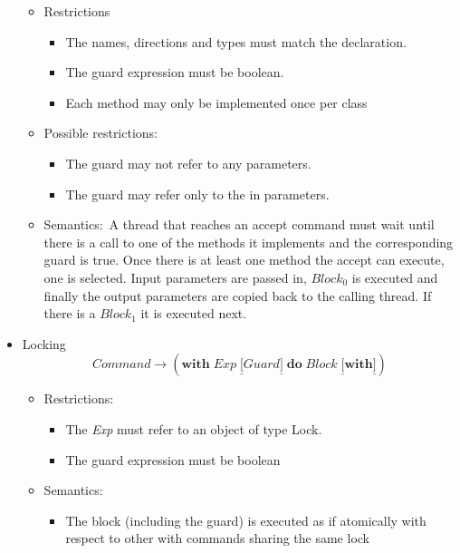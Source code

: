 \documentclass{article}%
\begin{document}
\begin{itemize}
\begin{itemize}
\item Restrictions

\begin{itemize}
\item The names, directions and types must match the declaration.

\item The guard expression must be boolean.

\item Each method may only be implemented once per class
\end{itemize}

\item Possible restrictions:

\begin{itemize}
\item The guard may not refer to any parameters.

\item The guard may refer only to the in parameters.
\end{itemize}

\item Semantics:\ A thread that reaches an accept command must wait until
there is a call to one of the methods it implements and the corresponding
guard is true. Once there is at least one method the accept can execute, one
is selected. Input parameters are passed in, $Block_{0}$ is executed and
finally the output parameters are copied back to the calling thread. If there
is a $Block_{1}$ it is executed next.
\end{itemize}

\item Locking%
\[
Command\rightarrow\left(  \mathbf{with}\;Exp\;\underline{[}Guard\underline{]}%
\;\mathbf{do}\;Block\;\underline{[}\mathbf{with}\underline{]}\right)
\]


\begin{itemize}
\item Restrictions:

\begin{itemize}
\item The \textit{Exp} must refer to an object of type Lock.

\item The guard expression must be boolean
\end{itemize}

\item Semantics:\ 

\begin{itemize}
\item The block (including the guard) is executed as if atomically with
respect to other with commands sharing the same lock


\end{itemize}
\end{itemize}
\end{itemize}
\end{document}
